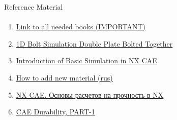 \documentclass[aspectratio=169]{beamer}
\newcommand{\fbckg}[1]{\usebackgroundtemplate{\texttt{[image: \#1]}}}%
\begin{document}
\begin{frame}[t]{Reference Material}
    \framesubtitle{}
    \begin{enumerate}
        \item \href{https://disk.yandex.ru/d/Q6H7la7iLdeh5Q}{Link to all needed books (IMPORTANT)}
        \item \href{https://youtu.be/vBilPNT2POM}{1D Bolt Simulation Double Plate Bolted Together}
        \item \href{https://youtu.be/xqBRiOuGGfw}{Introduction of Basic Simulation in NX CAE}
        \item \href{https://youtu.be/e0mKgo4m-kk}{How to add new material (rus)}
        \item \href{https://www.youtube.com/playlist?list=PLrlbZU2HDT4n-BPs-EW9x2PCWBDqmRi5H}{NX CAE. Основы расчетов на прочность в NX}
        \item \href{https://youtu.be/1jJtZCUNQNo}{CAE Durability, PART-1}
    \end{enumerate}
    \end{frame}

\fbckg{fibeamer/figs/last_page.png}
\frame[plain]{}
\end{document}
